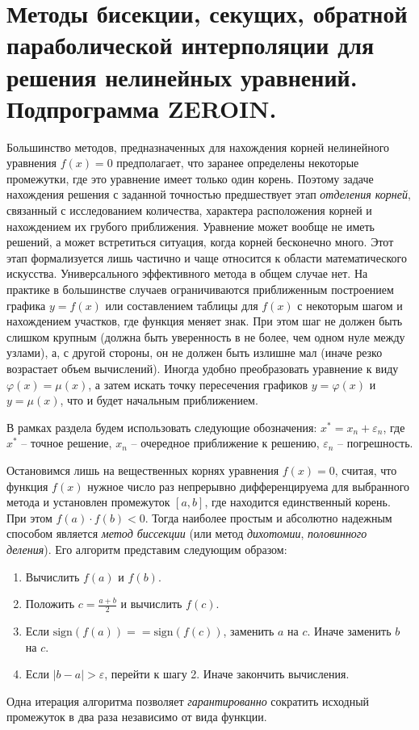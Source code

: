 \documentclass[../../calc-math-exam-2023.tex]{subfiles}
\begin{document}
    \section{Методы бисекции, секущих, обратной параболической интерполяции для решения нелинейных уравнений. Подпрограмма \textbf{ZEROIN}.}\label{sec:ch22}
    Большинство методов, предназначенных для нахождения корней нелинейного уравнения $f(x) = 0$ предполагает, что
    заранее определены некоторые промежутки, где это уравнение имеет только один корень. Поэтому задаче нахождения
    решения с заданной точностью предшествует этап \emph{отделения корней}, связанный с исследованием количества,
    характера расположения корней и нахождением их грубого приближения. Уравнение может вообще не иметь решений, а может
    встретиться ситуация, когда корней бесконечно много. Этот этап формализуется лишь частично и чаще относится к области
    математического искусства. Универсального эффективного метода в общем случае нет. На практике в большинстве случаев
    ограничиваются приближенным построением графика $y = f(x)$ или составлением таблицы для $f(x)$ с некоторым шагом и
    нахождением участков, где функция меняет знак. При этом шаг не должен быть слишком крупным (должна быть уверенность
    в не более, чем одном нуле между узлами), а, с другой стороны, он не должен быть излишне мал (иначе резко возрастает
    объем вычислений). Иногда удобно преобразовать уравнение к виду $\displaystyle \varphi(x) = \mu(x)$, а затем искать
    точку пересечения графиков $y = \varphi(x)$ и $y = \mu(x)$, что и будет начальным приближением.

    В рамках раздела будем использовать следующие обозначения: $x^{*} = x_n + \varepsilon_n$, где $x^{*}$ -- точное
    решение, $x_n$ -- очередное приближение к решению, $\varepsilon_n$ -- погрешность.

    Остановимся лишь на вещественных корнях уравнения $f(x) = 0$, считая, что функция $f(x)$ нужное число раз
    непрерывно дифференцируема для выбранного метода и установлен промежуток $[a, b]$, где находится единственный корень.
    При этом $\displaystyle f(a) \cdot f(b) < 0$. Тогда наиболее простым и абсолютно надежным способом является
    \emph{метод биссекции} (или метод \emph{дихотомии}, \emph{половинного деления}). Его алгоритм представим следующим
    образом:
    \begin{enumerate}
        \item Вычислить $f(a)$ и $f(b)$.
        \item Положить $\displaystyle c = \frac{a + b}{2}$ и вычислить $f(c)$.
        \item Если $\text{sign}\left( f(a) \right) == \text{sign}\left( f(c) \right)$, заменить $a$ на $c$. Иначе заменить $b$ на $c$.
        \item Если $\displaystyle |b - a| > \varepsilon$, перейти к шагу 2. Иначе закончить вычисления.
    \end{enumerate}
    Одна итерация алгоритма позволяет \emph{гарантированно} сократить исходный промежуток в два раза независимо от вида
    функции.
\end{document}
